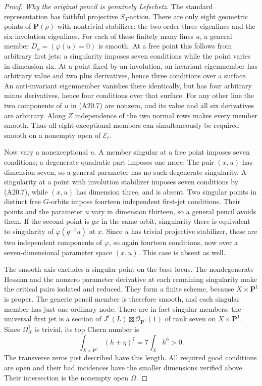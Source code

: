 \documentclass[11pt]{article}
\theoremstyle{remark}\newtheorem{remark}[theorem]{Remark}
\begin{document}
\begin{proof}
\emph{Why the original pencil is genuinely Lefschetz.}
The standard representation has faithful projective
$S_3$-action. There are only eight geometric points of
$\mathbf P(\rho)$ with nontrivial stabilizer: the two
order-three eigenlines and the six involution eigenlines.
For each of these finitely many lines $u$, a general
member $D_u=(\varphi(u)=0)$ is smooth.
At a free point this follows from arbitrary first jets:
a singularity imposes seven conditions while the point
varies in dimension six. At a point fixed by an
involution, an invariant eigenmember has arbitrary
value and two plus derivatives, hence three conditions
over a surface. An anti-invariant eigenmember vanishes
there identically, but has four arbitrary minus
derivatives, hence four conditions over that surface.
For any other line the two components of $u$ in (A20.7)
are nonzero, and its value and all six derivatives
are arbitrary. Along $Z$ independence of the two
normal rows makes every member smooth. Thus all eight
exceptional members can simultaneously be required
smooth on a nonempty open of $\mathcal E_t$.

Now vary a nonexceptional $u$. A member singular at a
free point imposes seven conditions; a degenerate
quadratic part imposes one more. The pair $(x,u)$ has
dimension seven, so a general parameter has no such
degenerate singularity. A singularity at a point with
involution stabilizer imposes seven conditions by
(A20.7), while $(x,u)$ has dimension three, and is absent.
Two singular points in distinct free $G$-orbits impose
fourteen independent first-jet conditions. Their points
and the parameter $u$ vary in dimension thirteen, so
a general pencil avoids them. If the second point is
$gx$ in the same orbit, singularity there is equivalent
to singularity of $\varphi(g^{-1}u)$ at $x$. Since $u$
has trivial projective stabilizer, these are two
independent components of $\varphi$, so again fourteen
conditions, now over a seven-dimensional parameter
space $(x,u)$. This case is absent as well.

The smooth axis excludes a singular point on the base
locus. The nondegenerate Hessian and the nonzero
parameter derivative at each remaining singularity
make the critical pairs isolated and reduced. They
form a finite scheme, because $X\times\mathbf P^1$ is
proper. The generic pencil member is therefore smooth,
and each singular member has just one ordinary node.
There are in fact singular members: the universal
first jet is a section of
$J^1(L)\boxtimes\mathcal O_{\mathbf P^1}(1)$ of rank
seven on $X\times\mathbf P^1$. Since $\Omega_X^1$ is
trivial, its top Chern number is
\[
            \int_{X\times\mathbf P^1}(h+\eta)^7
                        =7\int_Xh^6>0.
 \tag{A20.8}
\]
The transverse zeros just described have this length.
All required good conditions are open and their bad
incidences have the smaller dimensions verified above.
Their intersection is the nonempty open $\Omega$.


\end{proof}
\end{document}
